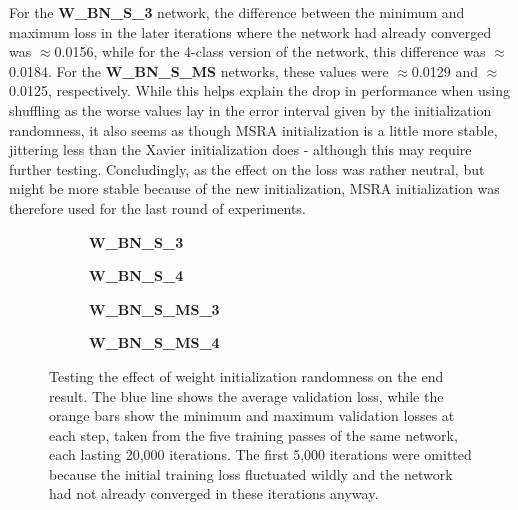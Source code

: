 For the \textbf {W\_BN\_S\_3} network, the difference between the minimum and maximum loss in the later iterations where the network had already converged was $\approx$0.0156, while for the 4-class version of the network, this difference was $\approx$0.0184. For the \textbf{W\_BN\_S\_MS} networks, these values were $\approx$0.0129 and $\approx$0.0125, respectively. While this helps explain the drop in performance when using shuffling as the worse values lay in the error interval given by the initialization randomness, it also seems as though MSRA initialization is a little more stable, jittering less than the Xavier initialization does - although this may require further testing. Concludingly, as the effect on the loss was rather neutral, but might be more stable because of the new initialization, MSRA initialization was therefore used for the last round of experiments.\\

\begin {figure}[!htb]
	\begin {subfigure}[b]{0.4\linewidth}
		\scalebox{0.65}{}
		\caption{\textbf{W\_BN\_S\_3}}
	\end {subfigure}\hspace{1.75cm}
	\begin {subfigure}[b]{0.4\linewidth}
		\scalebox{0.65}{}
		\caption{\textbf{W\_BN\_S\_4}}
	\end {subfigure}

	\begin {subfigure}[b]{0.4\linewidth}
		\scalebox{0.65}{}
		\caption{\textbf{W\_BN\_S\_MS\_3}}
	\end {subfigure}\hspace{1.75cm}
	\begin {subfigure}[b]{0.4\linewidth}
		\scalebox{0.65}{}
		\caption{\textbf{W\_BN\_S\_MS\_4}}
	\end {subfigure}

		\caption[Weight jitter testing.]{Testing the effect of weight initialization randomness on the end result. The blue line shows the average validation loss, while the orange bars show the minimum and maximum validation losses at each step, taken from the five training passes of the same network, each lasting 20,000 iterations. The first 5,000 iterations were omitted because the initial training loss fluctuated wildly and the network had not already converged in these iterations anyway.}
		\label{fig:weight_jitter}
\end {figure}


